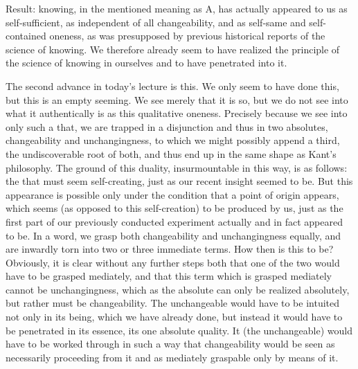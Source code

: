 Result: knowing, in the mentioned meaning as A, has actually appeared
to us as self-sufficient, as independent of all changeability,
and as self-same and self-contained oneness, as was presupposed by
previous historical reports of the science of knowing.
We therefore already seem to have realized
the principle of the science of knowing in ourselves
and to have penetrated into it.

The second advance in today's lecture is this.
We only seem to have done this, but this is an empty seeming.
We see merely that it is so, but we do not see into
what it authentically is as this qualitative oneness.
Precisely because we see into only such a that,
we are trapped in a disjunction and thus in two absolutes,
changeability and unchangingness, to which we
might possibly append a third, the undiscoverable root of both,
and thus end up in the same shape as Kant's philosophy.
The ground of this duality, insurmountable in this way, is as follows:
the that must seem self-creating, just as our recent insight seemed to be.
But this appearance is possible only under the
condition that a point of origin appears,
which seems (as opposed to this self-creation) to be produced by us,
just as the first part of our previously conducted experiment actually
and in fact appeared to be.
In a word, we grasp both changeability and unchangingness equally, and
are inwardly torn into two or three immediate terms.
How then is this to be?
Obviously, it is clear without any further steps both that
one of the two would have to be grasped mediately,
and that this term which is grasped mediately cannot be
unchangingness, which as the absolute can only be realized absolutely,
but rather must be changeability.
The unchangeable would have to be intuited not only in its being,
which we have already done, but instead it would have
to be penetrated in its essence, its one absolute quality.
It (the unchangeable) would have to be worked through in such a way
that changeability would be seen as necessarily proceeding from it
and as mediately graspable only by means of it.

